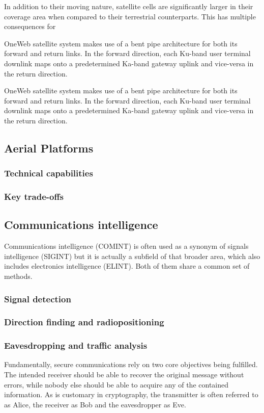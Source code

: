 \documentclass[english, 12pt, a4paper, elec, utf8, a-1b, online]{aaltothesis}
\begin{document}
In addition to their moving nature, satellite cells are significantly larger in their coverage area when compared to their terrestrial counterparts. This has multiple consequences for 
 \cite{corson2019admission}

 OneWeb satellite system makes use of a bent pipe architecture for both its forward and return links. In the forward direction, each Ku-band user terminal downlink maps onto a predetermined Ka-band gateway uplink and vice-versa in the return direction. \cite{worldvu2016loi, portillo2019technical}

OneWeb satellite system makes use of a bent pipe architecture for both its forward and return links. In the forward direction, each Ku-band user terminal downlink maps onto a predetermined Ka-band gateway uplink and vice-versa in the return direction. \cite{worldvu2016loi, portillo2019technical}

\subsection{Aerial Platforms}
\subsubsection{Technical capabilities}
\subsubsection{Key trade-offs}

\subsection{Communications intelligence}
Communications intelligence (COMINT) is often used as a synonym of signals intelligence (SIGINT) but it is actually a subfield of that broader area, which also includes electronics intelligence (ELINT). Both of them share a common set of methods. 

\subsubsection{Signal detection}
\subsubsection{Direction finding and radiopositioning}
\subsubsection{Eavesdropping and traffic analysis}
Fundamentally, secure communications rely on two core objectives being fulfilled. The intended receiver should be able to recover the original message without errors, while nobody else should be able to acquire any of the contained information. As is customary in cryptography, the transmitter is often referred to as Alice, the receiver as Bob and the eavesdropper as Eve. \cite{bloch2011physical}
\end{document}

